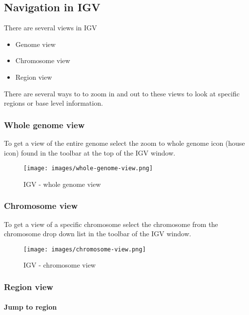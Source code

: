 \documentclass[11pt]{article}
\providecommand{\tightlist}{%
      \setlength{\itemsep}{0pt}\setlength{\parskip}{0pt}}
\begin{document}
    \hypertarget{navigation-in-igv}{%
\subsection{Navigation in IGV}\label{navigation-in-igv}}

There are several views in IGV

\begin{itemize}
\tightlist
\item
  Genome view
\item
  Chromosome view
\item
  Region view
\end{itemize}

There are several ways to to zoom in and out to these views to look at
specific regions or base level information.

    \hypertarget{whole-genome-view}{%
\subsubsection{Whole genome view}\label{whole-genome-view}}

To get a view of the entire genome select the zoom to whole genome icon
(house icon) found in the toolbar at the top of the IGV window.

    \begin{figure}
\centering
\texttt{[image: images/whole-genome-view.png]}
\caption{IGV - whole genome view}
\end{figure}

    \hypertarget{chromosome-view}{%
\subsubsection{Chromosome view}\label{chromosome-view}}

To get a view of a specific chromosome select the chromosome from the
chromosome drop down list in the toolbar of the IGV window.

    \begin{figure}
\centering
\texttt{[image: images/chromosome-view.png]}
\caption{IGV - chromosome view}
\end{figure}

    \hypertarget{region-view}{%
\subsubsection{Region view}\label{region-view}}

\hypertarget{jump-to-region}{%
\paragraph{Jump to region}\label{jump-to-region}}
\end{document}

